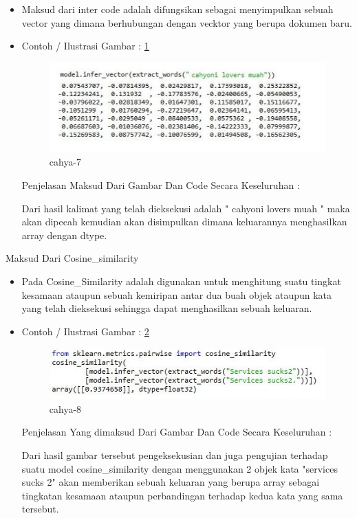 \begin{itemize}
\item Maksud dari inter code adalah difungsikan sebagai menyimpulkan sebuah vector yang dimana berhubungan dengan vecktor yang berupa  dokumen baru.
\item Contoh / Ilustrasi Gambar : \ref{cahya-7}
\par
\begin{figure}[!hbtp]
\centering
\includegraphics[scale=0.3]{figures/cahya-7.jpg}
\caption{cahya-7}
\label{cahya-7}
\end{figure}
\par
\par Penjelasan  Maksud Dari Gambar Dan Code Secara Keseluruhan  : 
\par Dari hasil kalimat yang telah dieksekusi adalah "  cahyoni lovers muah " maka akan dipecah kemudian akan disimpulkan dimana keluarannya menghasilkan array dengan dtype.
\par
\end{itemize}
\item Maksud Dari Cosine\_similarity
\begin{itemize}
\item Pada Cosine\_Similarity adalah digunakan untuk menghitung suatu tingkat kesamaan ataupun sebuah  kemiripan antar dua buah objek ataupun kata yang telah dieksekusi sehingga dapat menghasilkan sebuah keluaran.
\item Contoh / Ilustrasi Gambar : \ref{cahya-8}
\par
\begin{figure}[!hbtp]
\centering
\includegraphics[scale=0.3]{figures/cahya-8.jpg}
\caption{cahya-8}
\label{cahya-8}
\end{figure}
\par
\par Penjelasan  Yang dimaksud Dari Gambar Dan Code Secara Keseluruhan : 
\par Dari hasil gambar tersebut pengeksekusian dan juga pengujian terhadap suatu model cosine\_similarity dengan menggunakan 2 objek kata "services sucks 2" akan memberikan sebuah keluaran yang berupa array sebagai tingkatan kesamaan ataupun perbandingan terhadap kedua kata yang sama tersebut.
\par
\end{itemize}
